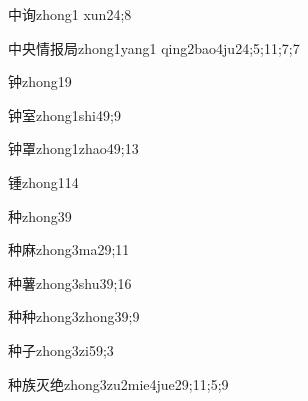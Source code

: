 \begin{verbete}{中询}{zhong1 xun2}{4;8}
\end{verbete}

\begin{verbete}{中央情报局}{zhong1yang1 qing2bao4ju2}{4;5;11;7;7}
\end{verbete}

\begin{verbete}{钟}{zhong1}{9}
\end{verbete}

\begin{verbete}{钟室}{zhong1shi4}{9;9}
\end{verbete}

\begin{verbete}{钟罩}{zhong1zhao4}{9;13}
\end{verbete}

\begin{verbete}{锺}{zhong1}{14}
\end{verbete}

\begin{verbete}{种}{zhong3}{9}
\end{verbete}

\begin{verbete}{种麻}{zhong3ma2}{9;11}
\end{verbete}

\begin{verbete}{种薯}{zhong3shu3}{9;16}
\end{verbete}

\begin{verbete}{种种}{zhong3zhong3}{9;9}
\end{verbete}

\begin{verbete}{种子}{zhong3zi5}{9;3}
\end{verbete}

\begin{verbete}{种族灭绝}{zhong3zu2mie4jue2}{9;11;5;9}
\end{verbete}

